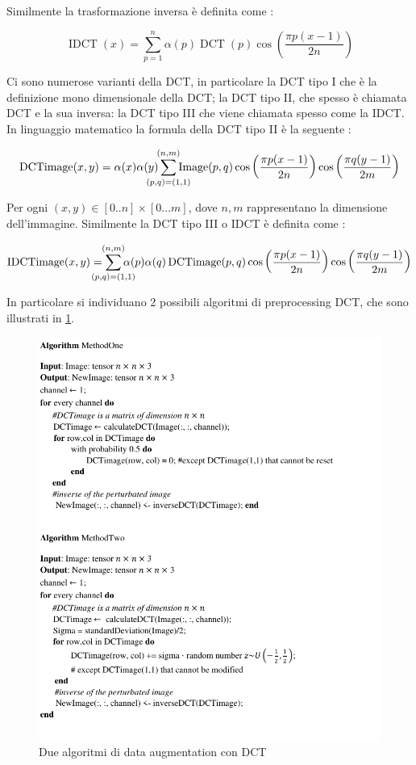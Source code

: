 Similmente la trasformazione inversa è definita come \cite{syed_dct}:

\[\operatorname{IDCT}(x)=\sum^{n}_{p=1} \alpha(p)\operatorname{DCT}(p) \cos \left(\frac { \pi p  (x- 1) } { 2 n }\right)\]


Ci sono numerose varianti della DCT, in particolare la DCT tipo I che è la definizione mono dimensionale della DCT; la DCT tipo II, che spesso è chiamata DCT e la sua inversa: la DCT tipo III che viene chiamata spesso come la IDCT. In linguaggio matematico la formula della DCT tipo II è la seguente \cite{syed_dct} \cite{gonzalez_dip} \cite{nanni_dct_pca}:


\[\operatorname{DCTimage} ( x , y ) = \alpha( x ) \alpha (y) \sum _ { \mathclap{(p , q) = (1,1)} } ^ { \mathclap{(n,m)} }  \operatorname { Image } ( p , q ) \cos \left(\frac { \pi p  (x-1) } { 2 n }  \right) \cos \left(\frac { \pi q  (y-1) } { 2 m }  \right) \]

Per ogni \((x,y) \in [0..n]\times [0...m]\), dove \(n,m\) rappresentano la dimensione dell'immagine. Similmente la DCT tipo III o IDCT è definita come \cite{syed_dct} \cite{gonzalez_dip}:

\[\operatorname{IDCTimage} ( x , y ) = \sum _ { \mathclap{(p , q) = (1,1) }} ^ {  \mathclap{(n,m) }} \alpha( p ) \alpha (q) \operatorname { DCTimage } ( p , q ) \cos \left(\frac {  \pi p  (x-1) } { 2 n }  \right) \cos \left(\frac { \pi q  (y-1) } { 2 m }  \right) \]

In particolare si individuano 2 possibili algoritmi di preprocessing DCT, che sono illustrati in \cref{fig:dct-algoritmi}.
\begin{figure}[ht]
    \centering
    \includegraphics[width=1\textwidth]{addestramento-rete-neurale/Algorithm-MethodDCT.pdf}
    \caption{Due algoritmi di data augmentation con DCT}
    \label{fig:dct-algoritmi}
\end{figure}
